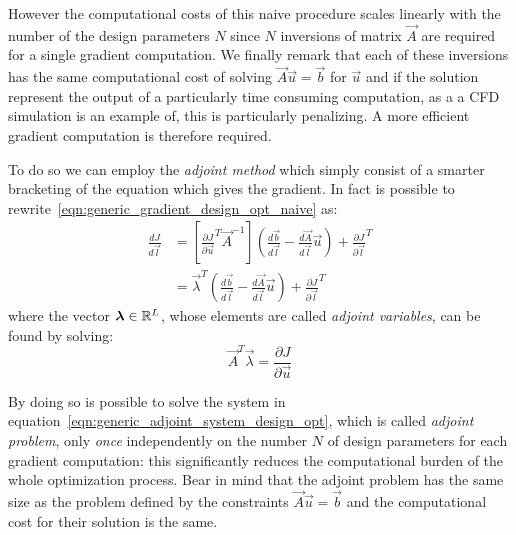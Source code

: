 However the computational costs of this naive procedure scales linearly with the number of the design parameters $N$ since $N$ inversions of matrix $\vec{A}$ are required for a single gradient computation. We finally remark that each of these inversions has the same computational cost of solving $\vec{A} \vec{u}= \vec{b}$ for $\vec{u}$ and if the solution represent the output of a particularly time consuming computation, as a a CFD simulation is an example of, this is particularly penalizing. A more efficient gradient computation is therefore required.

\smallskip
To do so we can employ the \emph{adjoint method} which simply consist of a smarter bracketing of the equation which gives the gradient. In fact is possible to rewrite~\eqref{eqn:generic_gradient_design_opt_naive} as:
\begin{equation}
	\begin{aligned}
		\frac{dJ}{d\vec{l}} & = \left[ \frac{\partial J}{\partial \vec{u}}^T \vec{A}^{-1} \right] \left( \frac{d\vec{b}}{d\vec{l}} - \frac{d\vec{A}}{d\vec{l}}\vec{u} \right) + \frac{\partial J}{\partial \vec{l}}^T  \\[2ex]
							& = \vec{\lambda}^T \left( \frac{d\vec{b}}{d\vec{l}} - \frac{d\vec{A}}{d\vec{l}}\vec{u} \right) + \frac{\partial J}{\partial \vec{l}}^T
	\end{aligned}
\end{equation}
where the vector $\boldsymbol{\lambda} \in \mathbb{R}^L$, whose elements are called \emph{adjoint variables}, can be found by solving:
\begin{equation}
	\label{eqn:generic_adjoint_system_design_opt}
	\vec{A}^T \vec{\lambda} = \frac{\partial J}{\partial \vec{u}}
\end{equation}

By doing so is possible to solve the system in equation~\eqref{eqn:generic_adjoint_system_design_opt}, which is called \emph{adjoint problem}, only \emph{once} independently on the number $N$ of design parameters for each gradient computation: this significantly reduces the computational burden of the whole optimization process. Bear in mind that the adjoint problem has the same size as the problem defined by the constraints $\vec{A} \vec{u} = \vec{b}$ and the computational cost for their solution is the same.


